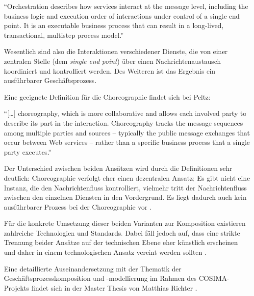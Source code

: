   \begin{definition}[Orchestrierung]\label{def:orchestrierung}
    "`Orchestration describes how services interact at the message level, including the business logic and execution order of interactions under control of a single end point. It is an executable business process that can result in a long-lived, transactional, multistep process model."' \emph{\citep[S. 41]{papazoglou2007soc}}
  \end{definition}
  
  Wesentlich sind also die Interaktionen verschiedener Dienste, die von einer zentralen Stelle (dem \emph{single end point}) über einen Nachrichtenaustausch koordiniert und kontrolliert werden. Des Weiteren ist das Ergebnis ein ausführbarer Geschäftsprozess.

  Eine geeignete Definition für die Choreographie findet sich bei Peltz:

  \begin{definition}[Choreographie]\label{def:choreographie}
    "`[\ldots] choreography, which is more collaborative and allows each involved party to describe its part in the interaction. Choreography tracks the message sequences among multiple parties and sources -- typically the public message exchanges that occur between Web services -- rather than a specific business process that a single party executes."' \emph{\citep[S. 46]{peltz2003wso}}
  \end{definition}

  Der Unterschied zwischen beiden Ansätzen wird durch die Definitionen sehr deutlich: Choreographie verfolgt eher einen dezentralen Ansatz; Es gibt nicht eine Instanz, die den Nachrichtenfluss kontrolliert, vielmehr tritt der Nachrichtenfluss zwischen den einzelnen Diensten in den Vordergrund. Es liegt dadurch auch kein ausführbarer Prozess bei der Choreographie vor \citep[S. 46]{peltz2003wso}.
  
  Für die konkrete Umsetzung dieser beiden Varianten zur Komposition existieren zahlreiche Technologien und Standards. Dabei fäll jedoch auf, dass eine strikte Trennung beider Ansätze auf der technischen Ebene eher künstlich erscheinen und daher in einem technologischen Ansatz vereint werden sollten \citep[S. 42]{papazoglou2007soc}.
  
  Eine detaillierte Auseinandersetzung mit der Thematik der Geschäftsprozesskomposition und -modellierung im Rahmen des COSIMA-Projekts findet sich in der Master Thesis von Matthias Richter \citep{samma08}.

